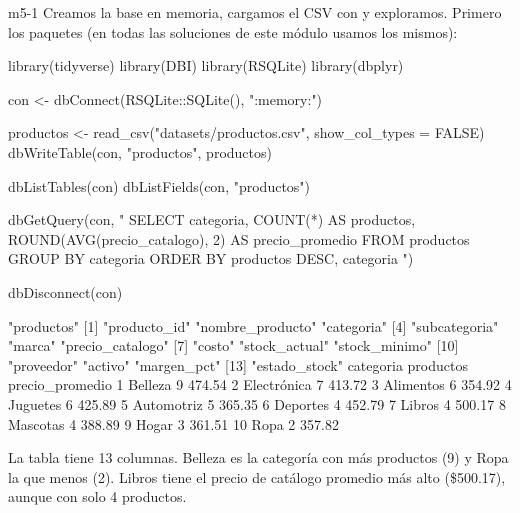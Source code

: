 
\begin{solucion}{m5-1}
Creamos la base en memoria, cargamos el CSV con  y
exploramos. Primero los paquetes (en todas las soluciones de este módulo
usamos los mismos):

\begin{rcode}
library(tidyverse)
library(DBI)
library(RSQLite)
library(dbplyr)
\end{rcode}

\begin{rcode}
con <- dbConnect(RSQLite::SQLite(), ":memory:")

productos <- read_csv("datasets/productos.csv", show_col_types = FALSE)
dbWriteTable(con, "productos", productos)

dbListTables(con)
dbListFields(con, "productos")

dbGetQuery(con, "
  SELECT categoria,
         COUNT(*)                      AS productos,
         ROUND(AVG(precio_catalogo), 2) AS precio_promedio
  FROM productos
  GROUP BY categoria
  ORDER BY productos DESC, categoria
")

dbDisconnect(con)
\end{rcode}

\begin{rsalida}
[1] "productos"
 [1] "producto_id"     "nombre_producto" "categoria"      
 [4] "subcategoria"    "marca"           "precio_catalogo"
 [7] "costo"           "stock_actual"    "stock_minimo"   
[10] "proveedor"       "activo"          "margen_pct"     
[13] "estado_stock"   
     categoria productos precio_promedio
1      Belleza         9          474.54
2  Electrónica         7          413.72
3    Alimentos         6          354.92
4     Juguetes         6          425.89
5   Automotriz         5          365.35
6     Deportes         4          452.79
7       Libros         4          500.17
8     Mascotas         4          388.89
9        Hogar         3          361.51
10        Ropa         2          357.82
\end{rsalida}

La tabla tiene 13 columnas. Belleza es la categoría con más productos (9) y
Ropa la que menos (2). Libros tiene el precio de catálogo promedio más
alto (\$500.17), aunque con solo 4 productos.
\end{solucion}

